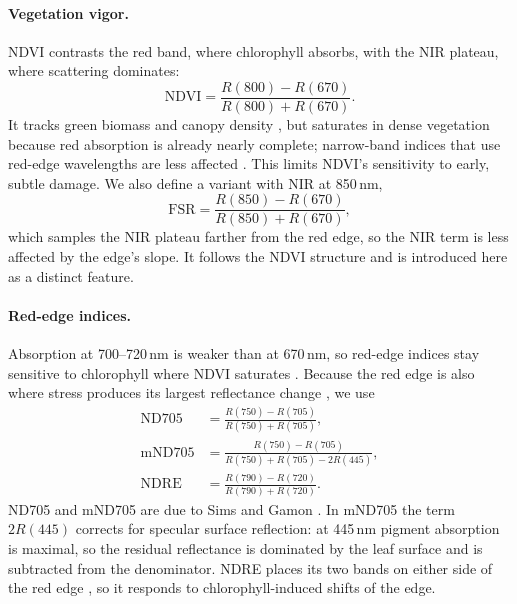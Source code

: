 \documentclass[conference]{IEEEtran}
\begin{document}
\paragraph{Vegetation vigor.}
NDVI contrasts the red band, where chlorophyll absorbs, with the NIR plateau,
where scattering dominates:
\begin{equation}
\mathrm{NDVI}=\frac{R(800)-R(670)}{R(800)+R(670)}.
\end{equation}
It tracks green biomass and canopy density \cite{rouse1973}, but saturates in
dense vegetation because red absorption is already nearly complete; narrow-band
indices that use red-edge wavelengths are less affected \cite{mutanga2004}.
This limits NDVI's sensitivity to early, subtle damage.
We also define a variant with NIR at 850\,nm,
\begin{equation}
\mathrm{FSR}=\frac{R(850)-R(670)}{R(850)+R(670)},
\end{equation}
which samples the NIR plateau farther from the red edge, so the NIR term
is less affected by the edge's slope. It follows the NDVI structure
\cite{rouse1973} and is introduced here as a distinct feature.

\paragraph{Red-edge indices.}
Absorption at 700--720\,nm is weaker than at 670\,nm, so red-edge indices stay
sensitive to chlorophyll where NDVI saturates \cite{gitelson1994,mutanga2004}.
Because the red edge is also where stress produces its largest reflectance
change \cite{carter2001}, we use
\begin{align}
\mathrm{ND705}&=\frac{R(750)-R(705)}{R(750)+R(705)},\\
\mathrm{mND705}&=\frac{R(750)-R(705)}{R(750)+R(705)-2R(445)},\\
\mathrm{NDRE}&=\frac{R(790)-R(720)}{R(790)+R(720)}.
\end{align}
ND705 and mND705 are due to Sims and Gamon \cite{sims2002}. In mND705 the term
$2R(445)$ corrects for specular surface reflection: at 445\,nm
pigment absorption is maximal, so the residual reflectance is dominated by
the leaf surface and is subtracted from the denominator.
NDRE places its two bands on either side of the red edge
\cite{barnes2000,gitelson2003}, so it responds to chlorophyll-induced
shifts of the edge.
\end{document}
